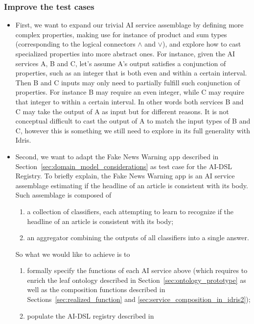 \documentclass[]{report}
\begin{document}
\subsubsection{Improve the test cases}
\label{sec:improve_test_cases}
\begin{itemize}
\item First, we want to expand our trivial AI service assemblage by
  defining more complex properties, making use for instance of product
  and sum types (corresponding to the logical connectors $\wedge$ and
  $\vee$), and explore how to cast specialized properties into more
  abstract ones.  For instance, given the AI services A, B and C,
  let's assume A's output satisfies a conjunction of properties, such
  as an integer that is both even and within a certain interval.  Then
  B and C inputs may only need to partially fulfill such conjunction
  of properties.  For instance B may require an even integer, while C
  may require that integer to within a certain interval.  In other
  words both services B and C may take the output of A as input but
  for different reasons.  It is not conceptual difficult to cast the
  output of A to match the input types of B and C, however this is
  something we still need to explore in its full generality with
  Idris.
\item Second, we want to adapt the Fake News Warning app described in
  Section~\ref{sec:domain_model_considerations} as test case for the
  AI-DSL Registry.  To briefly explain, the Fake News Warning app is
  an AI service assemblage estimating if the headline of an article is
  consistent with its body.  Such assemblage is composed of
  \begin{enumerate}
  \item a collection of classifiers, each attempting to learn to
    recognize if the headline of an article is consistent with its body;
  \item an aggregator combining the outputs of all classifiers into a
    single answer.
  \end{enumerate}
  So what we would like to achieve is to
  \begin{enumerate}
  \item formally specify the functions of each AI service above (which
    requires to enrich the leaf ontology described in
    Section~\ref{sec:ontology_prototype} as well as the composition
    functions described in Sections~\ref{sec:realized_function} and
    \ref{sec:service_composition_in_idris2});
  \item populate the AI-DSL registry described in

\end{enumerate}
\end{itemize}
\end{document}
